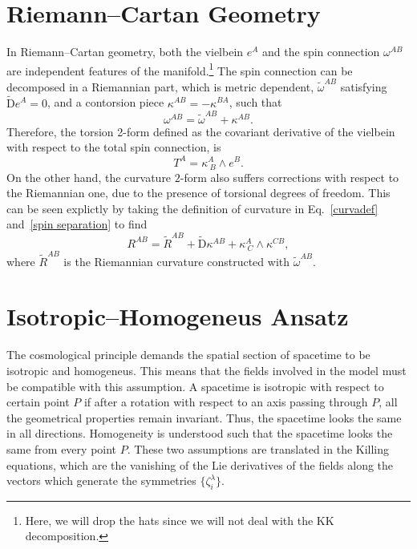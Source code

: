 \documentclass[aps,prd,12pt,superscriptaddress,showpacs,showkeys,longbibliography,reprint,nofootinbib]{revtex4-1}
\begin{document}
\appendix

\section{Riemann--Cartan Geometry\label{Riemann-Cartan}}

In Riemann--Cartan geometry, both the vielbein $e^A$ and the spin connection $\omega^{AB}$ are independent features of the manifold.\footnote{Here, we will drop the hats since we will not deal with the KK decomposition.} The spin connection can be decomposed in a Riemannian part, which is metric dependent, $\tilde{\omega}^{AB}$ satisfying $\tilde{\mbox{D}}e^A=0$, and a contorsion piece $\kappa^{AB}=-\kappa^{BA}$, such that 
\begin{equation}\label{spin separation}
  \omega^{AB}=\tilde{\omega}^{AB}+\kappa^{AB}.
\end{equation} 
Therefore, the torsion 2-form defined as the covariant derivative of the vielbein with respect to the total spin connection, is
\begin{equation}
  T^A=\kappa^A_{\ B}\wedge e^B.
\end{equation}
On the other hand, the curvature $2$-form also suffers corrections with respect to the Riemannian one, due to the presence of torsional degrees of freedom. This can be seen explictly by taking the definition of curvature in Eq.~\eqref{curvadef} and~\eqref{spin separation} to find
\begin{equation}\label{curvature decomp}
  R^{AB} = \tilde{R}^{AB} + \tilde{\mbox{D}}\kappa^{AB} + \kappa^A_{\ C}\wedge\kappa^{CB},
\end{equation}
where $\tilde{R}^{AB}$ is the Riemannian curvature constructed with $\tilde{\omega}^{AB}$.


\section{Isotropic--Homogeneus Ansatz\label{homotropic}}

The cosmological principle demands the spatial section of spacetime to be isotropic and homogeneus. This means that the fields involved in the model must be compatible with this assumption. A spacetime is isotropic with respect to certain point $P$ if after a rotation with respect to an axis passing through $P$, all the geometrical properties remain invariant. Thus, the spacetime looks the same in all directions. Homogeneity is understood such that the spacetime looks the same from every point $P$. These two assumptions are translated in the Killing equations, which are the vanishing of the Lie derivatives of the fields along the vectors which generate the symmetries $\{\zeta^\lambda_{i}\}$. 
\end{document}
